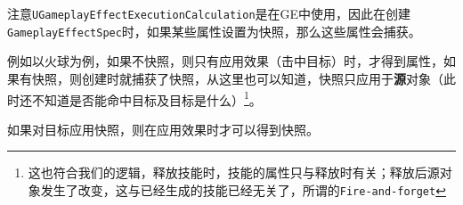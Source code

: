 \documentclass[10pt,a4paper,x11names,dvipsnames,svgnames,oneside]{ctexbook}
\begin{document}
注意\texttt{UGameplayEffectExecutionCalculation}是在GE中使用，因此在创建\texttt{GameplayEffectSpec}时，如果某些属性设置为快照，那么这些属性会捕获。

例如以火球为例，如果不快照，则只有应用效果（击中目标）时，才得到属性，如果有快照，则创建时就捕获了快照，从这里也可以知道，快照只应用于\textbf{源}对象（此时还不知道是否能命中目标及目标是什么）\footnote{这也符合我们的逻辑，释放技能时，技能的属性只与释放时有关；释放后源对象发生了改变，这与已经生成的技能已经无关了，所谓的\texttt{Fire-and-forget}}。

如果对目标应用快照，则在应用效果时才可以得到快照。
\end{document}
